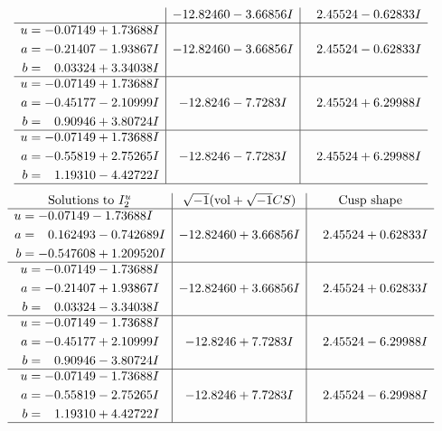 \documentclass[1p]{elsarticle_modified}
\theoremstyle{definition}
\newcommand{\I}{\sqrt{-1}}
\begin{document}
$$\begin{array}{c|c|c}
 & -12.82460 - 3.66856 I & \phantom{-}2.45524 - 0.62833 I \\ \hline\begin{aligned}
u &= -0.07149 + 1.73688 I \\
a &= -0.21407 - 1.93867 I \\
b &= \phantom{-}0.03324 + 3.34038 I\end{aligned}
 & -12.82460 - 3.66856 I & \phantom{-}2.45524 - 0.62833 I \\ \hline\begin{aligned}
u &= -0.07149 + 1.73688 I \\
a &= -0.45177 - 2.10999 I \\
b &= \phantom{-}0.90946 + 3.80724 I\end{aligned}
 & -12.8246 - 7.7283 I & \phantom{-}2.45524 + 6.29988 I \\ \hline\begin{aligned}
u &= -0.07149 + 1.73688 I \\
a &= -0.55819 + 2.75265 I \\
b &= \phantom{-}1.19310 - 4.42722 I\end{aligned}
 & -12.8246 - 7.7283 I & \phantom{-}2.45524 + 6.29988 I\\
 \hline 
 \end{array}$$\newpage$$\begin{array}{c|c|c}  
\text{Solutions to }I^u_{2}& \I (\text{vol} + \sqrt{-1}CS) & \text{Cusp shape}\\
 \hline 
\begin{aligned}
u &= -0.07149 - 1.73688 I \\
a &= \phantom{-}0.162493 - 0.742689 I \\
b &= -0.547608 + 1.209520 I\end{aligned}
 & -12.82460 + 3.66856 I & \phantom{-}2.45524 + 0.62833 I \\ \hline\begin{aligned}
u &= -0.07149 - 1.73688 I \\
a &= -0.21407 + 1.93867 I \\
b &= \phantom{-}0.03324 - 3.34038 I\end{aligned}
 & -12.82460 + 3.66856 I & \phantom{-}2.45524 + 0.62833 I \\ \hline\begin{aligned}
u &= -0.07149 - 1.73688 I \\
a &= -0.45177 + 2.10999 I \\
b &= \phantom{-}0.90946 - 3.80724 I\end{aligned}
 & -12.8246 + 7.7283 I & \phantom{-}2.45524 - 6.29988 I \\ \hline\begin{aligned}
u &= -0.07149 - 1.73688 I \\
a &= -0.55819 - 2.75265 I \\
b &= \phantom{-}1.19310 + 4.42722 I\end{aligned}
 & -12.8246 + 7.7283 I & \phantom{-}2.45524 - 6.29988 I\\
 \hline 
 \end{array}$$\newpage\newpage\renewcommand{\arraystretch}{1}
\end{document}
